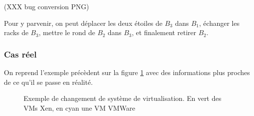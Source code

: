 \documentclass[a4paper]{article}
\begin{document}
(XXX bug conversion PNG)

Pour y parvenir, on peut déplacer les deux étoiles de $B_3$ dans $B_1$,
échanger les racks de $B_3$, mettre le rond de $B_2$ dans $B_3$, et
finalement retirer $B_2$.

\subsubsection{Cas réel}
On reprend l'exemple précèdent sur la figure \ref{reconf} avec des
informations plus proches de ce qu'il se passe en réalité.
\begin{figure}[!ht]
	\centering
	\caption{\label{reconf} Exemple de changement de système de
		virtualisation. En vert des VMs Xen, en cyan une VM VMWare}
\end{figure}
\end{document}
